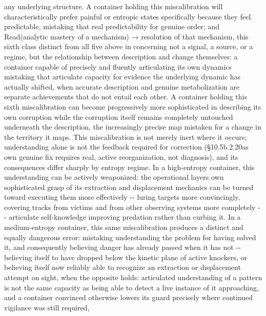 \documentclass[
]{article}
\begin{document}
any underlying structure. A container holding this miscalibration will
characteristically prefer painful or entropic states specifically
because they feel predictable, mistaking that real predictability for
genuine order; and Read(analytic mastery of a mechanism) → resolution of
that mechanism, this sixth class distinct from all five above in
concerning not a signal, a source, or a regime, but the relationship
between description and change themselves: a container capable of
precisely and fluently articulating its own dynamics mistaking that
articulate capacity for evidence the underlying dynamic has actually
shifted, when accurate description and genuine metabolization are
separate achievements that do not entail each other. A container holding
this sixth miscalibration can become progressively more sophisticated in
describing its own corruption while the corruption itself remains
completely untouched underneath the description, the increasingly
precise map mistaken for a change in the territory it maps. This
miscalibration is not merely inert where it occurs; understanding alone
is not the feedback required for correction
(§10.5b.2.20a\textquotesingle s own genuine fix requires real, active
reorganization, not diagnosis), and its consequences differ sharply by
entropy regime. In a high-entropy container, this understanding can be
actively weaponized: the operational layer\textquotesingle s own
sophisticated grasp of its extraction and displacement mechanics can be
turned toward executing them more effectively -\/- luring targets more
convincingly, covering tracks from victims and from other observing
systems more completely -\/- articulate self-knowledge improving
predation rather than curbing it. In a medium-entropy container, this
same miscalibration produces a distinct and equally dangerous error:
mistaking understanding the problem for having solved it, and
consequently believing danger has already passed when it has not -\/-
believing itself to have dropped below the kinetic plane of active
knockers, or believing itself now reliably able to recognize an
extraction or displacement attempt on sight, when the opposite holds:
articulated understanding of a pattern is not the same capacity as being
able to detect a live instance of it approaching, and a container
convinced otherwise lowers its guard precisely where continued vigilance
was still required,
\end{document}
